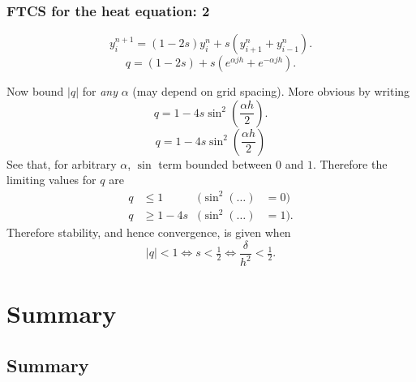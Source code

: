 \documentclass{beamer}
\begin{document}
\begin{frame}
  \frametitle{FTCS for the heat equation: 2}

  \begin{equation*}
    y_i^{n+1} = ( 1 - 2 s ) y_i^n + s \left( y_{i+1}^n + y_{i-1}^n
    \right).
  \end{equation*}
  \begin{equation*}
    q = (1 - 2 s) + s \left( e^{\alpha j h} +  e^{-\alpha j h} \right).
  \end{equation*}
  \begin{overlayarea}{\textwidth}{0.7\textheight}
    {
      Now bound $|q|$ for \emph{any} $\alpha$
      (may depend on grid spacing).
    }
    {
      More obvious by writing
      \begin{equation*}
        q = 1 - 4 s \sin^2 \left(\frac{\alpha h}{2} \right).
      \end{equation*}
    }
    {
      \vspace{-1ex}
      \begin{equation*}
        q = 1 - 4 s \sin^2 \left(\frac{\alpha h}{2} \right)
      \end{equation*}
      See that, for arbitrary $\alpha$, $\sin$ term
      bounded between $0$ and $1$.
    }
    {
      Therefore the limiting values for $q$ are
      \begin{align*}
        q & \le 1 & (\sin^2(\dots) & = 0) \\
        q & \ge 1 - 4 s & (\sin^2(\dots) & = 1).
      \end{align*}
    }
    {
      Therefore stability, and hence convergence, is given when \vspace{-.5ex}
      \begin{equation*}
        |q| < 1 \Leftrightarrow s < \tfrac{1}{2} \Leftrightarrow
        \frac{\delta}{h^2} < \tfrac{1}{2}.
      \end{equation*}
    }
  \end{overlayarea}

\end{frame}

\section{Summary}

\subsection{Summary}
\end{document}
